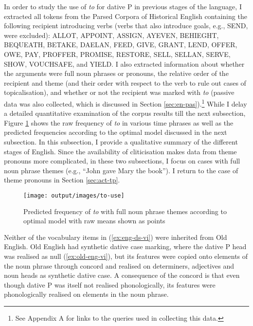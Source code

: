 	In order to study the use of \textit{to} for dative P in previous stages of the language, I extracted all tokens from the Parsed Corpora of Historical English \citep{Kroch.2000,Taylor.2003,Kroch.2004,Taylor.2006,Kroch.2010} containing the following recipient introducing verbs (verbs that also introduce goals, e.g., SEND, were excluded): ALLOT, APPOINT, ASSIGN, AYEVEN, BEHIEGHT, BEQUEATH, BETAKE, DAELAN, FEED, GIVE, GRANT, LEND, OFFER, OWE, PAY, PROFFER, PROMISE, RESTORE, SELL, SELLAN, SERVE, SHOW, VOUCHSAFE, and YIELD. I also extracted information about whether the arguments were full noun phrases or pronouns, the relative order of the recipient and theme (and their order with respect to the verb to rule out cases of topicalisation), and whether or not the recipient was marked with \textit{to} (passive data was also collected, which is discussed in Section \ref{sec:en-pas}).\footnote{See Appendix A for links to the queries used in collecting this data.} While I delay a detailed quantitative examination of the corpus results till the next subsection, Figure \ref{fig:to-use} shows the raw frequency of \textit{to} in various time phrases as well as the predicted frequencies according to the optimal model discussed in the next subsection. In this subsection, I provide a qualitative summary of the different stages of English. Since the availability of cliticisation makes data from theme pronouns more complicated, in these two subsections, I focus on cases with full noun phrase themes (e.g., ``John gave Mary the book''). I return to the case of theme pronouns in Section \ref{sec:act-tp}.

	\begin{figure}[ht!]
		\texttt{[image: output/images/to-use]}
		\caption{Predicted frequency of \textit{to} with full noun phrase themes according to optimal model with raw means shown as points}
		\label{fig:to-use}
	\end{figure}

	Neither of the vocabulary items in (\ref{ex:eng-ds-vi}) were inherited from Old English. Old English had synthetic dative case marking, where the dative P head was realised as null (\ref{ex:old-eng-vi}), but its features were copied onto elements of the noun phrase through concord and realised on determiners, adjectives and noun heads as synthetic dative case. A consequence of the concord is that even though dative P was itself not realised phonologically, its features were phonologically realised on elements in the noun phrase. 
	
